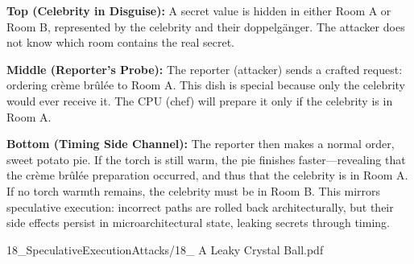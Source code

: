 \begin{SideNotePage}{
  \textbf{Top (Celebrity in Disguise):} A secret value is hidden in either Room A or Room B, represented by the celebrity and their doppelgänger. The attacker does not know which room contains the real secret. \par
  \textbf{Middle (Reporter’s Probe):} The reporter (attacker) sends a crafted request: ordering crème brûlée to Room A. This dish is special because only the celebrity would ever receive it. The CPU (chef) will prepare it only if the celebrity is in Room A. \par
  \textbf{Bottom (Timing Side Channel):} The reporter then makes a normal order, sweet potato pie. If the torch is still warm, the pie finishes faster—revealing that the crème brûlée preparation occurred, and thus that the celebrity is in Room A. If no torch warmth remains, the celebrity must be in Room B. This mirrors speculative execution: incorrect paths are rolled back architecturally, but their side effects persist in microarchitectural state, leaking secrets through timing. \par

}{18_SpeculativeExecutionAttacks/18_ A Leaky Crystal Ball.pdf}
\end{SideNotePage}
